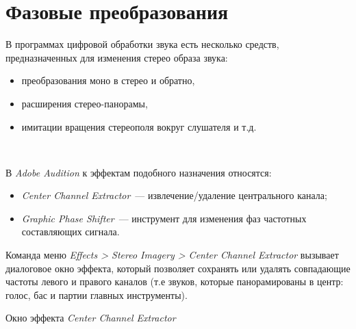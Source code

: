 \documentclass{beamer}
\begin{document}
\section{Фазовые преобразования}
\begin{frame}
  В программах цифровой обработки звука есть несколько средств, предназначенных для изменения стерео образа звука:
  \begin{itemize}
    \item преобразования моно в стерео и обратно,
    \item расширения стерео-панорамы,
    \item имитации вращения стереополя вокруг слушателя и т.д.
  \end{itemize}

  ~

  В \textit{Adobe Audition} к эффектам подобного назначения относятся:
  \begin{itemize}
    \item \textit{Center Channel Extractor}~--- извлечение/удаление центрального канала;
    \item \textit{Graphic Phase Shifter}~--- инструмент для изменения фаз частотных составляющих сигнала.
  \end{itemize}
\end{frame}

\begin{frame}
  Команда меню \textit{Effects > Stereo Imagery > Center Channel Extractor} вызывает диалоговое окно эффекта, который позволяет сохранять или удалять совпадающие частоты левого и правого каналов (т.е звуков, которые панорамированы в центр: голос, бас и партии главных инструменты).

  \begin{block}{Окно эффекта \emph{Center Channel Extractor}}
  \end{block}
\end{frame}
\end{document}
